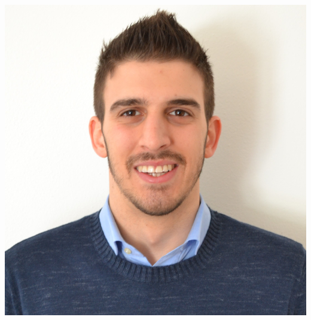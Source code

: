 \documentclass[9pt]{developercv_mattia} %
\begin{document}
\hfill
\begin{minipage}[t]{0.20\textwidth} %
	\vspace{-\baselineskip} %
		\hfill
	\includegraphics[width=1.0\linewidth]{../shared/Fototessera.jpg}
\end{minipage}
%
%
%
\end{document}
